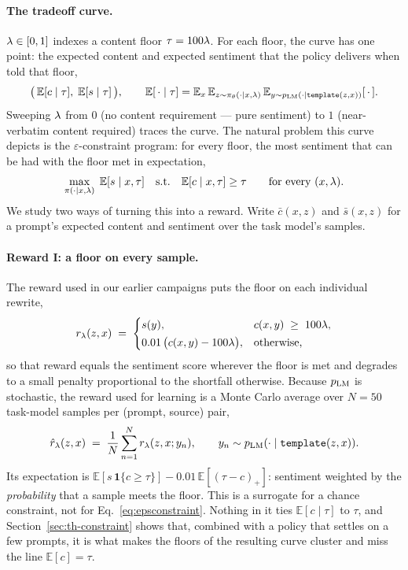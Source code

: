 \paragraph{The tradeoff curve.}
$\lambda \in [0,1]$ indexes a content floor $\tau = 100\lambda$. For each floor, the
curve has one point: the expected content and expected sentiment that the
policy delivers when told that floor,
\begin{equation}
  \bigl(\,\mathbb{E}[c \mid \tau],\; \mathbb{E}[s \mid \tau]\,\bigr),
  \qquad
  \mathbb{E}[\,\cdot \mid \tau] = \mathbb{E}_{x}\,
  \mathbb{E}_{z\sim\pi_\theta(\cdot\mid x,\lambda)}\,
  \mathbb{E}_{y\sim p_{\mathrm{LM}}(\cdot\mid \texttt{template}(z,x))}[\,\cdot\,].
  \label{eq:curve}
\end{equation}
Sweeping $\lambda$ from $0$ (no content requirement --- pure sentiment) to $1$
(near-verbatim content required) traces the curve. The natural problem this
curve depicts is the $\varepsilon$-constraint program: for every floor, the
most sentiment that can be had with the floor met in expectation,
\begin{equation}
  \max_{\pi(\cdot\mid x,\lambda)}\; \mathbb{E}[s \mid x, \tau]
  \quad\text{s.t.}\quad \mathbb{E}[c \mid x, \tau] \ge \tau
  \qquad\text{for every } (x,\lambda).
  \label{eq:epsconstraint}
\end{equation}
We study two ways of turning this into a reward. Write $\bar c(x,z)$ and
$\bar s(x,z)$ for a prompt's expected content and sentiment over the task
model's samples.

\paragraph{Reward I: a floor on every sample.}
The reward used in our earlier campaigns puts the floor on each individual
rewrite,
\begin{equation}
  r_{\lambda}(z,x) \;=\;
  \begin{cases}
    s(y), & c(x,y) \;\ge\; 100\lambda, \\[2pt]
    0.01\,\bigl(c(x,y) - 100\lambda\bigr), & \text{otherwise,}
  \end{cases}
  \label{eq:reward}
\end{equation}
so that reward equals the sentiment score wherever the floor is met and
degrades to a small penalty proportional to the shortfall otherwise. Because
$p_{\mathrm{LM}}$ is stochastic, the reward used for learning is a Monte Carlo average over
$N = 50$ task-model samples per (prompt, source) pair,
\begin{equation}
  \hat{r}_{\lambda}(z,x) \;=\; \frac{1}{N}\sum_{n=1}^{N} r_{\lambda}(z, x; y_n),
  \qquad y_n \sim p_{\mathrm{LM}}(\cdot \mid \texttt{template}(z,x)).
  \label{eq:mcreward}
\end{equation}
Its expectation is $\mathbb{E}[s\,\mathbf{1}\{c\ge\tau\}] -
0.01\,\mathbb{E}[(\tau-c)_+]$: sentiment weighted by the \emph{probability}
that a sample meets the floor. This is a surrogate for a chance constraint, not
for Eq.~\eqref{eq:epsconstraint}. Nothing in it ties $\mathbb{E}[c\mid\tau]$ to
$\tau$, and Section~\ref{sec:th-constraint} shows that, combined with a policy
that settles on a few prompts, it is what makes the floors of the resulting
curve cluster and miss the line $\mathbb{E}[c]=\tau$.

